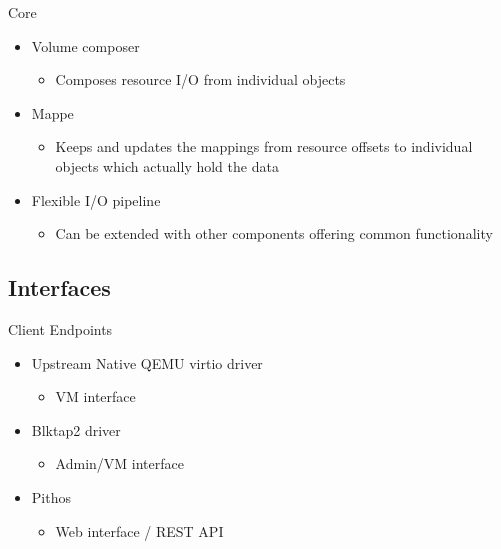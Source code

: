 \documentclass[utf8]{beamer}
\begin{document}
\begin{frame}{Core}
  \begin{itemize}
    \item Volume composer
      \begin{itemize}
      \item Composes resource I/O from individual objects
      \end{itemize}
    \item Mappe
      \begin{itemize}
      \item Keeps and updates the mappings from resource offsets to
        individual objects which actually hold the data
      \end{itemize}
    \item Flexible I/O pipeline
      \begin{itemize}
      \item Can be extended with other components offering common
        functionality
      \end{itemize}
  \end{itemize}
\end{frame}

\subsection{Interfaces}

\begin{frame}{Client Endpoints}
  \begin{itemize}
  \item Upstream Native QEMU virtio driver
    \begin{itemize}
    \item VM interface
    \end{itemize}
  \item Blktap2 driver
    \begin{itemize}
    \item Admin/VM interface
    \end{itemize}
  \item Pithos
    \begin{itemize}
    \item Web interface / REST API
    \end{itemize}
  \end{itemize}
\end{frame}
\end{document}
